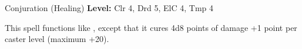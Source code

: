 {Conjuration (Healing)}
{
	\textbf{Level:}
	Clr 4, Drd 5, ElC 4, Tmp 4\\
}
{
	This spell functions like , except that it cures 4d8 points of damage +1 point per caster level (maximum +20).

}
